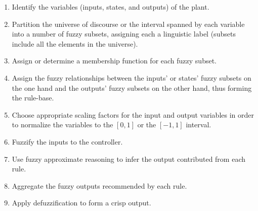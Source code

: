 \documentclass{article}
\begin{document}
\begin{enumerate}
\item Identify the variables (inputs, states, and outputs) of the plant.
\item  Partition the universe of discourse or the interval spanned by each variable into a
number of fuzzy subsets, assigning each a linguistic label (subsets include all the
elements in the universe).
\item Assign or determine a membership function for each fuzzy subset.
\item Assign the fuzzy relationships between the inputs’ or states’ fuzzy subsets on the one
hand and the outputs’ fuzzy subsets on the other hand, thus forming the rule-base.
\item Choose appropriate scaling factors for the input and output variables in order to normalize
the variables to the $[0, 1]$ or the $[-1, 1]$ interval.
\item Fuzzify the inputs to the controller.
\item Use fuzzy approximate reasoning to infer the output contributed from each rule.
\item Aggregate the fuzzy outputs recommended by each rule.
\item Apply defuzzification to form a crisp output.
\end{enumerate}
\end{document}
